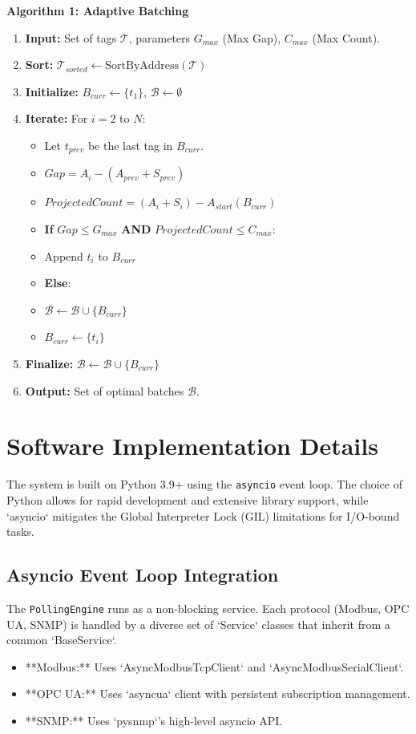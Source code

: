\documentclass[journal]{IEEEtran}
\begin{document}
\textbf{Algorithm 1: Adaptive Batching}
\begin{enumerate}
    \item \textbf{Input:} Set of tags $\mathcal{T}$, parameters $G_{max}$ (Max Gap), $C_{max}$ (Max Count).
    \item \textbf{Sort:} $\mathcal{T}_{sorted} \leftarrow \text{SortByAddress}(\mathcal{T})$
    \item \textbf{Initialize:} $B_{curr} \leftarrow \{t_1\}$, $\mathcal{B} \leftarrow \emptyset$
    \item \textbf{Iterate:} For $i = 2$ to $N$:
    \begin{itemize}
        \item Let $t_{prev}$ be the last tag in $B_{curr}$.
        \item $Gap = A_i - (A_{prev} + S_{prev})$
        \item $ProjectedCount = (A_i + S_i) - A_{start}(B_{curr})$
        \item \textbf{If} $Gap \leq G_{max}$ \textbf{AND} $ProjectedCount \leq C_{max}$:
            \item Append $t_i$ to $B_{curr}$
        \item \textbf{Else}:
            \item $\mathcal{B} \leftarrow \mathcal{B} \cup \{B_{curr}\}$
            \item $B_{curr} \leftarrow \{t_i\}$
    \end{itemize}
    \item \textbf{Finalize:} $\mathcal{B} \leftarrow \mathcal{B} \cup \{B_{curr}\}$
    \item \textbf{Output:} Set of optimal batches $\mathcal{B}$.
\end{enumerate}

\section{Software Implementation Details}
The system is built on Python 3.9+ using the \texttt{asyncio} event loop. The choice of Python allows for rapid development and extensive library support, while `asyncio` mitigates the Global Interpreter Lock (GIL) limitations for I/O-bound tasks.

\subsection{Asyncio Event Loop Integration}
The \texttt{PollingEngine} runs as a non-blocking service. Each protocol (Modbus, OPC UA, SNMP) is handled by a diverse set of `Service` classes that inherit from a common `BaseService`.
\begin{itemize}
    \item **Modbus:** Uses `AsyncModbusTcpClient` and `AsyncModbusSerialClient`.
    \item **OPC UA:** Uses `asyncua` client with persistent subscription management.
    \item **SNMP:** Uses `pysnmp`'s high-level asyncio API.
\end{itemize}
\end{document}

